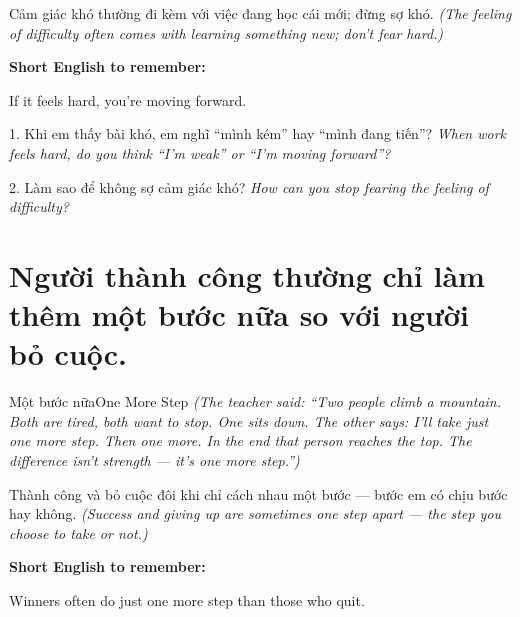 \begin{baihoc}
Cảm giác khó thường đi kèm với việc đang học cái mới; đừng sợ khó.
\textit{(The feeling of difficulty often comes with learning something new; don't fear hard.)}
\end{baihoc}

\begin{ghinhoanh}
\textbf{Short English to remember:}

If it feels hard, you're moving forward.

\end{ghinhoanh}

\begin{tuhocnhanh}
1. Khi em thấy bài khó, em nghĩ ``mình kém'' hay ``mình đang tiến''? \textit{When work feels hard, do you think ``I'm weak'' or ``I'm moving forward''?}

2. Làm sao để không sợ cảm giác khó? \textit{How can you stop fearing the feeling of difficulty?}
\end{tuhocnhanh}
\ngancach

\section{Người thành công thường chỉ làm thêm một bước nữa so với người bỏ cuộc.}
\begin{truyen}{Một bước nữa}{One More Step}
\textit{(The teacher said: ``Two people climb a mountain. Both are tired, both want to stop. One sits down. The other says: I'll take just one more step. Then one more. In the end that person reaches the top. The difference isn't strength — it's one more step.'')}
\end{truyen}

\begin{baihoc}
Thành công và bỏ cuộc đôi khi chỉ cách nhau một bước — bước em có chịu bước hay không.
\textit{(Success and giving up are sometimes one step apart — the step you choose to take or not.)}
\end{baihoc}

\begin{ghinhoanh}
\textbf{Short English to remember:}

Winners often do just one more step than those who quit.

\end{ghinhoanh}


